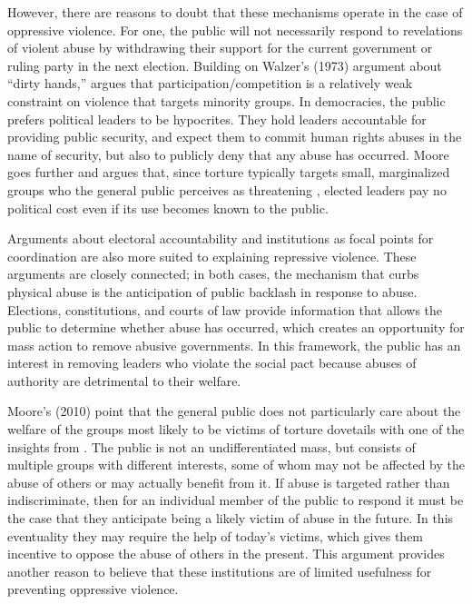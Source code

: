 \documentclass[11pt]{article}
\begin{document}
However, there are reasons to doubt that these mechanisms operate in the case of oppressive violence. For one, the public will not necessarily respond to revelations of violent abuse by withdrawing their support for the current government or ruling party in the next election. Building on Walzer's (1973) \nocite{Walzer1973} argument about ``dirty hands,'' \citet{Moore2010} argues that participation/competition is a relatively weak constraint on violence that targets minority groups. In democracies, the public prefers political leaders to be hypocrites. They hold leaders  accountable for providing public security, and expect them to commit human rights abuses in the name of security, but also to publicly deny that any abuse has occurred. Moore goes further and argues that, since torture typically targets small, marginalized groups who the general public perceives as threatening \citep{Rejali2007}, elected leaders pay no political cost even if its use becomes known to the public. 

Arguments about electoral accountability and institutions as focal points for coordination are also more suited to explaining repressive violence. These arguments are closely connected; in both cases, the mechanism that curbs physical abuse is the anticipation of public backlash in response to abuse. Elections, constitutions, and courts of law provide information that allows the public to determine whether abuse has occurred, which creates an opportunity for mass action to remove abusive governments. In this framework, the public has an interest in removing leaders who violate the social pact because abuses of authority are detrimental to their welfare. 

Moore's (2010) point that the general public does not particularly care about the welfare of the groups most likely to be victims of torture dovetails with one of the insights from \citet{Weingast1997}. The public is not an undifferentiated mass, but consists of multiple groups with different interests, some of whom may not be affected by the abuse of others or may actually benefit from it. If abuse is targeted rather than indiscriminate, then for an individual member of the public to respond it must be the case that they anticipate being a likely victim of abuse in the future. In this eventuality they may require the help of today's victims, which gives them incentive to oppose the abuse of others in the present. This argument provides another reason to believe that these institutions are of limited usefulness for preventing oppressive violence. 
\end{document}
